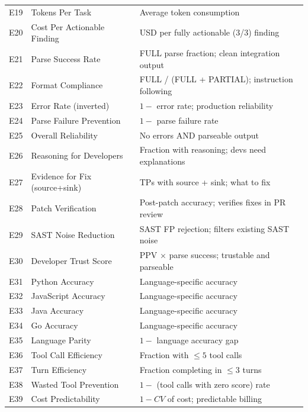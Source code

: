 \documentclass[10pt,twocolumn]{article}
\begin{document}
\begin{table}[t]
\begin{tabular}{@{}r l p{7.5cm}@{}}
E19 & Tokens Per Task                     & Average token consumption \\
E20 & Cost Per Actionable Finding         & USD per fully actionable (3/3) finding \\
E21 & Parse Success Rate                  & FULL parse fraction; clean integration output \\
E22 & Format Compliance                   & FULL / (FULL + PARTIAL); instruction following \\
E23 & Error Rate (inverted)               & $1 -$ error rate; production reliability \\
E24 & Parse Failure Prevention            & $1 -$ parse failure rate \\
E25 & Overall Reliability                 & No errors AND parseable output \\
E26 & Reasoning for Developers            & Fraction with reasoning; devs need explanations \\
E27 & Evidence for Fix (source+sink)      & TPs with source + sink; what to fix \\
E28 & Patch Verification                  & Post-patch accuracy; verifies fixes in PR review \\
E29 & SAST Noise Reduction                & SAST FP rejection; filters existing SAST noise \\
E30 & Developer Trust Score               & PPV ${\times}$ parse success; trustable and parseable \\
E31 & Python Accuracy                     & Language-specific accuracy \\
E32 & JavaScript Accuracy                 & Language-specific accuracy \\
E33 & Java Accuracy                       & Language-specific accuracy \\
E34 & Go Accuracy                         & Language-specific accuracy \\
E35 & Language Parity                     & $1 -$ language accuracy gap \\
E36 & Tool Call Efficiency                & Fraction with ${\leq}5$ tool calls \\
E37 & Turn Efficiency                     & Fraction completing in ${\leq}3$ turns \\
E38 & Wasted Tool Prevention              & $1 -$ (tool calls with zero score) rate \\
E39 & Cost Predictability                 & $1 - CV$ of cost; predictable billing \\

\end{tabular}
\end{table}
\end{document}
